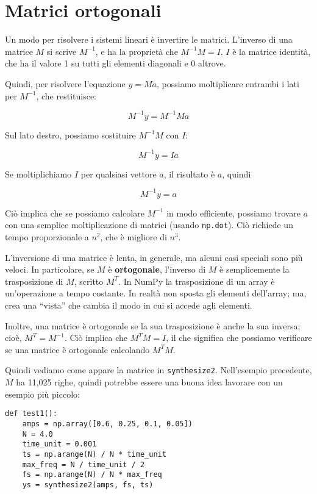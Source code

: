 \documentclass[12pt]{book} \usepackage[width=5.5in,height=8.5in, hmarginratio=3:2,vmarginratio=1:1]{geometry}
\begin{document}
\section{Matrici ortogonali} 

Un modo per risolvere i sistemi lineari è invertire le matrici. L'inverso di una matrice $M$ si scrive $M^{-1}$, e ha la proprietà che $M^{-1}M = I$. $I$ è la matrice identità, che ha il valore 1 su tutti gli elementi diagonali e 0 altrove.

Quindi, per risolvere l'equazione $y = Ma$, possiamo moltiplicare entrambi i lati per $M^{-1}$, che restituisce:

%
\[ M^{-1}y = M^{-1} M a \] 

%
Sul lato destro, possiamo sostituire $M^{-1}M$ con $I$:

%
\[ M^{-1}y = I a \] 

%
Se moltiplichiamo $I$ per qualsiasi vettore $a$, il risultato è $a$, quindi

%
\[ M^{-1}y = a \] 

%
Ciò implica che se possiamo calcolare $M^{-1}$ in modo efficiente, possiamo trovare $a$ con una semplice moltiplicazione di matrici (usando {\tt np.dot}). Ciò richiede un tempo proporzionale a $n^2$, che è migliore di $n^3$.

L'inversione di una matrice è lenta, in generale, ma alcuni casi speciali sono più veloci. In particolare, se $M$ è {\bf ortogonale}, l'inverso di $M$ è semplicemente la trasposizione di $M$, scritto $M^T$. In NumPy la trasposizione di un array è un'operazione a tempo costante. In realtà non sposta gli elementi dell'array; ma, crea una ``vista'' che cambia il modo in cui si accede agli elementi.

Inoltre, una matrice è ortogonale se la sua trasposizione è anche la sua inversa; cioè, $M^T = M^{-1}$. Ciò implica che $M^TM = I$, il che significa che possiamo verificare se una matrice è ortogonale calcolando $M^TM$.

Quindi vediamo come appare la matrice in {\tt synthesize2}. Nell'esempio precedente, $M$ ha 11,025 righe, quindi potrebbe essere una buona idea lavorare con un esempio più piccolo:

\begin{verbatim} 
def test1():
    amps = np.array([0.6, 0.25, 0.1, 0.05])
    N = 4.0
    time_unit = 0.001
    ts = np.arange(N) / N * time_unit
    max_freq = N / time_unit / 2
    fs = np.arange(N) / N * max_freq
    ys = synthesize2(amps, fs, ts)
 \end{verbatim} 
\end{document}
